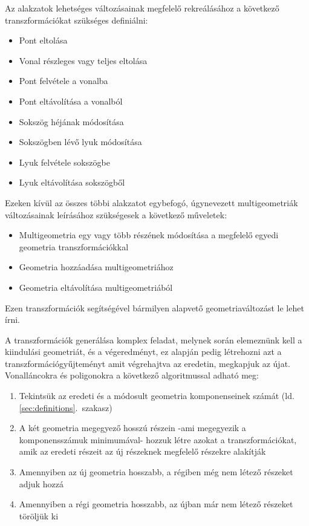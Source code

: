  Az alakzatok lehetséges változásainak megfelelő rekreálásához a következő transzformációkat szükséges definiálni:
\begin{itemize}
	\item Pont eltolása
	\item Vonal részleges vagy teljes eltolása
	\item Pont felvétele a vonalba
	\item Pont eltávolítása a vonalból
	\item Sokszög héjának módosítása
	\item Sokszögben lévő lyuk módosítása
	\item Lyuk felvétele sokszögbe
	\item Lyuk eltávolítása sokszögből
\end{itemize}
Ezeken kívül az összes többi alakzatot egybefogó, úgynevezett multigeometriák változásainak leírásához szükségesek a következő műveletek:
\begin{itemize}
	\item Multigeometria egy vagy több részének módosítása a megfelelő egyedi geometria transzformációkkal
	\item Geometria hozzáadása multigeometriához
	\item Geometria eltávolítása multigeometriából
\end{itemize}
Ezen transzformációk segítségével bármilyen alapvető geometriaváltozást le lehet írni.

A transzformációk generálása komplex feladat, melynek során elemeznünk kell a kiindulási geometriát, és a végeredményt, ez alapján pedig létrehozni azt a transzformációgyűjteményt amit végrehajtva az eredetin, megkapjuk az újat. Vonalláncokra és poligonokra a következő algoritmussal adható meg:
\begin{enumerate}
	\item Tekintsük az eredeti és a módosult geometria komponenseinek számát (ld. \ref{sec:definitions}.~szakasz)
	\item A két geometria megegyező hosszú részein -ami megegyezik a komponensszámuk minimumával- hozzuk létre azokat a transzformációkat, amik az eredeti részeit az új részeknek megfelelő részekre alakítják
	\item Amennyiben az új geometria hosszabb, a régiben még nem létező részeket adjuk hozzá
	\item Amennyiben a régi geometria hosszabb, az újban már nem létező részeket töröljük ki
\end{enumerate}

